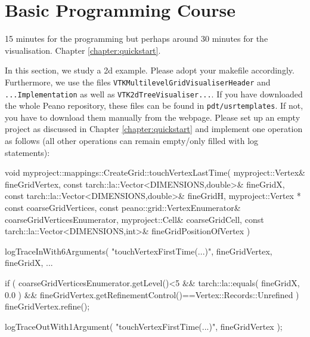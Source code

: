 \chapter{Basic Programming Course}
\label{chapter:basics-explained}


\chapterDescription
  {
    15 minutes for the programming but perhaps around 30 minutes for the
    visualisation.
  }
  {
    Chapter \ref{chapter:quickstart}.
  }


In this section, we study a 2d example.
Please adopt your makefile accordingly.
Furthermore, we use the files \texttt{VTKMultilevelGridVisualiserHeader} and
\texttt{...Implementation} as well as
\texttt{VTK2dTreeVisualiser...}.
If you have downloaded the whole Peano repository, these files can be found in
\texttt{pdt/usrtemplates}.
If not, you have to download them manually from the webpage.
Please set up an empty project as discussed in Chapter
\ref{chapter:quickstart} and implement one operation as follows (all other
operations can remain empty/only filled with log statements):


\begin{code}
void myproject::mappings::CreateGrid::touchVertexLastTime(
      myproject::Vertex&               fineGridVertex,
      const tarch::la::Vector<DIMENSIONS,double>&                          fineGridX,
      const tarch::la::Vector<DIMENSIONS,double>&                          fineGridH,
      myproject::Vertex * const        coarseGridVertices,
      const peano::grid::VertexEnumerator&                coarseGridVerticesEnumerator,
      myproject::Cell&                 coarseGridCell,
      const tarch::la::Vector<DIMENSIONS,int>&                             fineGridPositionOfVertex
) {
  logTraceInWith6Arguments( "touchVertexFirstTime(...)", fineGridVertex, fineGridX, ...

  if (
    coarseGridVerticesEnumerator.getLevel()<5
    &&
    tarch::la::equals( fineGridX, 0.0 )
    &&
    fineGridVertex.getRefinementControl()==Vertex::Records::Unrefined
  ) {
    fineGridVertex.refine();
  }

  logTraceOutWith1Argument( "touchVertexFirstTime(...)", fineGridVertex );
}

\end{code}


